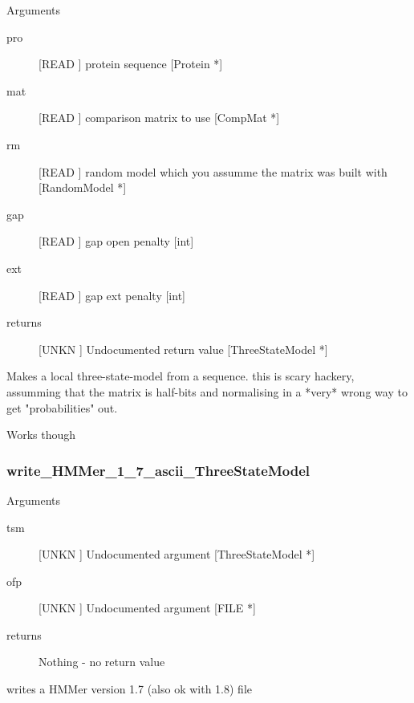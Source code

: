 Arguments
\begin{description}
\item[pro] [READ ] protein sequence [Protein *]
\item[mat] [READ ] comparison matrix to use [CompMat *]
\item[rm] [READ ] random model which you assumme the matrix was built with [RandomModel *]
\item[gap] [READ ] gap open penalty [int]
\item[ext] [READ ] gap ext penalty [int]
\item[returns] [UNKN ] Undocumented return value [ThreeStateModel *]
\end{description}
Makes a local three-state-model from a sequence.  this is scary
hackery, assumming that the matrix is half-bits and normalising in a
*very* wrong way to get "probabilities" out.


Works though


\subsubsection{write_HMMer_1_7_ascii_ThreeStateModel}

Arguments
\begin{description}
\item[tsm] [UNKN ] Undocumented argument [ThreeStateModel *]
\item[ofp] [UNKN ] Undocumented argument [FILE *]
\item[returns] Nothing - no return value
\end{description}
writes a HMMer version 1.7 (also ok with 1.8) file


